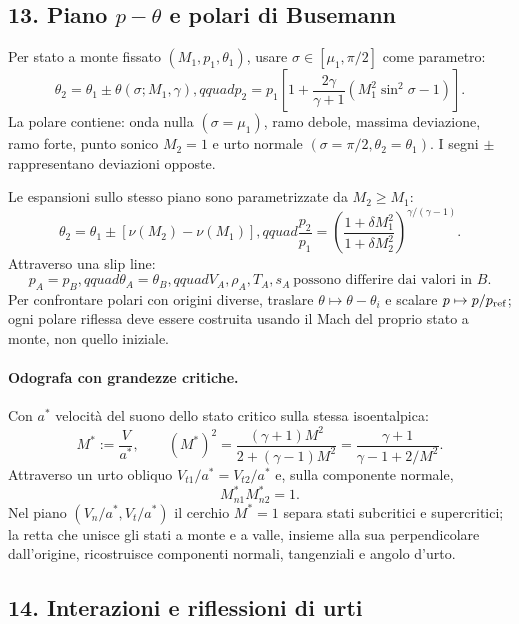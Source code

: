 \documentclass[11pt,a4paper]{article}
\begin{document}

\subsection*{13. Piano $p-\theta$ e polari di Busemann}

Per stato a monte fissato $(M_1,p_1,\theta_1)$, usare $\sigma\in[\mu_1,\pi/2]$ come
parametro:
\[
\theta_2=\theta_1\pm\theta(\sigma;M_1,\gamma),qquad
p_2=p_1\left[1+\frac{2\gamma}{\gamma+1}(M_1^2\sin^2\sigma-1)\right].
\]
La polare contiene: onda nulla $(\sigma=\mu_1)$, ramo debole, massima deviazione,
ramo forte, punto sonico $M_2=1$ e urto normale $(\sigma=\pi/2,\theta_2=\theta_1)$.
I segni $\pm$ rappresentano deviazioni opposte.

Le espansioni sullo stesso piano sono parametrizzate da $M_2\ge M_1$:
\[
\theta_2=\theta_1\pm[\nu(M_2)-\nu(M_1)],qquad
\frac{p_2}{p_1}=\left(\frac{1+\delta M_1^2}{1+\delta M_2^2}\right)^{\gamma/(\gamma-1)}.
\]
Attraverso una slip line:
\[
p_A=p_B,qquad \theta_A=\theta_B,qquad V_A,\rho_A,T_A,s_A
\ \text{possono differire dai valori in }B.
\]
Per confrontare polari con origini diverse, traslare $\theta\mapsto\theta-\theta_i$ e
scalare $p\mapsto p/p_{\rm ref}$; ogni polare riflessa deve essere costruita usando il
Mach del proprio stato a monte, non quello iniziale.

\paragraph*{Odografa con grandezze critiche.}
Con $a^*$ velocità del suono dello stato critico sulla stessa isoentalpica:
\[
M^*:=\frac V{a^*},\qquad
(M^*)^2=\frac{(\gamma+1)M^2}{2+(\gamma-1)M^2}
=\frac{\gamma+1}{\gamma-1+2/M^2}.
\]
Attraverso un urto obliquo $V_{t1}/a^*=V_{t2}/a^*$ e, sulla componente normale,
\[
M_{n1}^*M_{n2}^*=1.
\]
Nel piano $(V_n/a^*,V_t/a^*)$ il cerchio $M^*=1$ separa stati subcritici e
supercritici; la retta che unisce gli stati a monte e a valle, insieme alla sua
perpendicolare dall'origine, ricostruisce componenti normali, tangenziali e angolo
d'urto.


\subsection*{14. Interazioni e riflessioni di urti}
\end{document}
